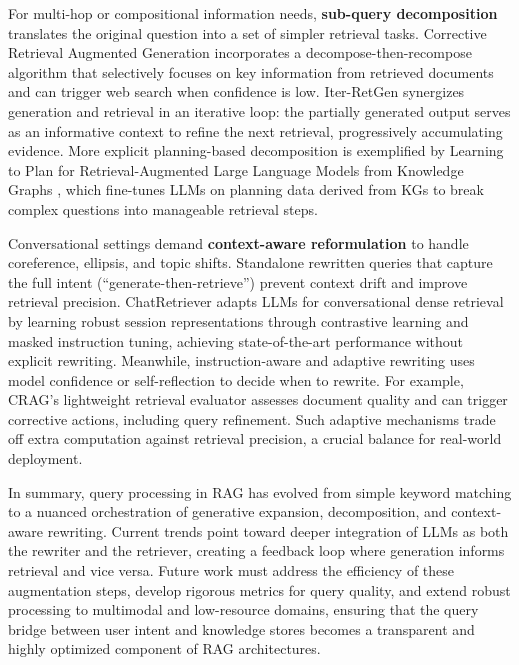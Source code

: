 \documentclass[11pt,a4paper]{article}
\begin{document}
For multi-hop or compositional information needs, \textbf{sub-query decomposition} translates the original question into a set of simpler retrieval tasks. Corrective Retrieval Augmented Generation \cite{arxiv:2401.15884v2} incorporates a decompose-then-recompose algorithm that selectively focuses on key information from retrieved documents and can trigger web search when confidence is low. Iter-RetGen \cite{arxiv:2305.15294v2} synergizes generation and retrieval in an iterative loop: the partially generated output serves as an informative context to refine the next retrieval, progressively accumulating evidence. More explicit planning-based decomposition is exemplified by Learning to Plan for Retrieval-Augmented Large Language Models from Knowledge Graphs \cite{arxiv:2406.14282v1}, which fine-tunes LLMs on planning data derived from KGs to break complex questions into manageable retrieval steps.

Conversational settings demand \textbf{context-aware reformulation} to handle coreference, ellipsis, and topic shifts. Standalone rewritten queries that capture the full intent (``generate-then-retrieve'') prevent context drift and improve retrieval precision. ChatRetriever \cite{arxiv:2404.13556v1} adapts LLMs for conversational dense retrieval by learning robust session representations through contrastive learning and masked instruction tuning, achieving state-of-the-art performance without explicit rewriting. Meanwhile, instruction-aware and adaptive rewriting uses model confidence or self-reflection to decide when to rewrite. For example, CRAG's lightweight retrieval evaluator assesses document quality and can trigger corrective actions, including query refinement. Such adaptive mechanisms trade off extra computation against retrieval precision, a crucial balance for real-world deployment.

In summary, query processing in RAG has evolved from simple keyword matching to a nuanced orchestration of generative expansion, decomposition, and context-aware rewriting. Current trends point toward deeper integration of LLMs as both the rewriter and the retriever, creating a feedback loop where generation informs retrieval and vice versa. Future work must address the efficiency of these augmentation steps, develop rigorous metrics for query quality, and extend robust processing to multimodal and low-resource domains, ensuring that the query bridge between user intent and knowledge stores becomes a transparent and highly optimized component of RAG architectures.
\end{document}
